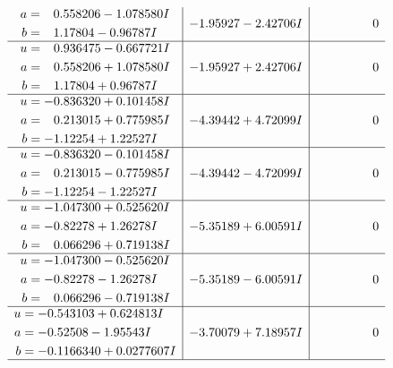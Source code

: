 \documentclass[1p]{elsarticle_modified}
\theoremstyle{definition}
\begin{document}
$$\begin{array}{c|c|c}
\begin{aligned}
a &= \phantom{-}0.558206 - 1.078580 I \\
b &= \phantom{-}1.17804 - 0.96787 I\end{aligned}
 & -1.95927 - 2.42706 I & \phantom{-0.000000 } 0 \\ \hline\begin{aligned}
u &= \phantom{-}0.936475 - 0.667721 I \\
a &= \phantom{-}0.558206 + 1.078580 I \\
b &= \phantom{-}1.17804 + 0.96787 I\end{aligned}
 & -1.95927 + 2.42706 I & \phantom{-0.000000 } 0 \\ \hline\begin{aligned}
u &= -0.836320 + 0.101458 I \\
a &= \phantom{-}0.213015 + 0.775985 I \\
b &= -1.12254 + 1.22527 I\end{aligned}
 & -4.39442 + 4.72099 I & \phantom{-0.000000 } 0 \\ \hline\begin{aligned}
u &= -0.836320 - 0.101458 I \\
a &= \phantom{-}0.213015 - 0.775985 I \\
b &= -1.12254 - 1.22527 I\end{aligned}
 & -4.39442 - 4.72099 I & \phantom{-0.000000 } 0 \\ \hline\begin{aligned}
u &= -1.047300 + 0.525620 I \\
a &= -0.82278 + 1.26278 I \\
b &= \phantom{-}0.066296 + 0.719138 I\end{aligned}
 & -5.35189 + 6.00591 I & \phantom{-0.000000 } 0 \\ \hline\begin{aligned}
u &= -1.047300 - 0.525620 I \\
a &= -0.82278 - 1.26278 I \\
b &= \phantom{-}0.066296 - 0.719138 I\end{aligned}
 & -5.35189 - 6.00591 I & \phantom{-0.000000 } 0 \\ \hline\begin{aligned}
u &= -0.543103 + 0.624813 I \\
a &= -0.52508 - 1.95543 I \\
b &= -0.1166340 + 0.0277607 I\end{aligned}
 & -3.70079 + 7.18957 I & \phantom{-0.000000 } 0\\
 \hline 
 \end{array}$$\newpage$$\begin{array}{c|c|c}  

\end{array}$$
\end{document}

